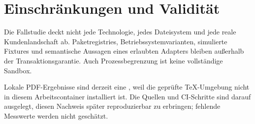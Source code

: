 \section{Einschränkungen und Validität}
\label{chap:limitations-validity}

Die Fallstudie deckt nicht jede Technologie, jedes Dateisystem und jede reale
Kundenlandschaft ab. Paketregistries, Betriebssystemvarianten, simulierte Fixtures und
semantische Aussagen eines erlaubten Adapters bleiben außerhalb der Transaktionsgarantie.
Auch Prozessbegrenzung ist keine vollständige Sandbox.

Lokale PDF-Ergebnisse sind derzeit eine \Limitation{}, weil die geprüfte TeX-Umgebung
nicht in diesem Arbeitscontainer installiert ist. Die Quellen und CI-Schritte sind darauf
ausgelegt, diesen Nachweis später reproduzierbar zu erbringen; fehlende Messwerte werden
nicht geschätzt.
